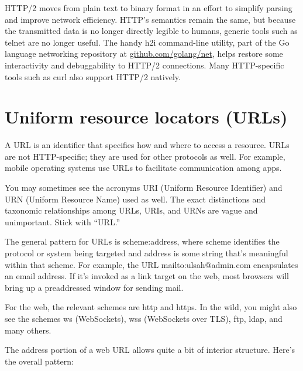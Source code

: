 HTTP/2 moves from plain text to binary format in an effort to simplify
parsing and improve network efficiency. HTTP's semantics remain the
same, but because the transmitted data is no longer directly legible to
humans, generic tools such as {telnet} are no longer useful. The handy
\protect\hypertarget{part0027_split_001.htmlux5cux23_idIndexMarker2748}{}{}\protect\hypertarget{part0027_split_001.htmlux5cux23_idIndexMarker2749}{}{}{h2i}
command-line utility, part of the Go language networking repository at
\href{http://github.com/golang/net}{github.com/golang/net}, helps
restore some interactivity and debuggability to HTTP/2 connections. Many
HTTP-specific tools such as
\protect\hypertarget{part0027_split_001.htmlux5cux23_idIndexMarker2750}{}{}{curl}
also support HTTP/2 natively.


\section{Uniform resource locators (URLs)}


\protect\hypertarget{part0027_split_002.htmlux5cux23_idIndexMarker2751}{}{}\protect\hypertarget{part0027_split_002.htmlux5cux23_idIndexMarker2752}{}{}A
URL is an identifier that specifies how and where to access a resource.
URLs are not HTTP-specific; they are used for other protocols as well.
For example, mobile operating systems use URLs to facilitate
communication among apps.

You may sometimes see the acronyms
\protect\hypertarget{part0027_split_002.htmlux5cux23_idIndexMarker2753}{}{}URI
(Uniform Resource Identifier) and
\protect\hypertarget{part0027_split_002.htmlux5cux23_idIndexMarker2754}{}{}URN
(Uniform Resource Name) used as well. The exact distinctions and
taxonomic relationships among URLs, URIs, and URNs are vague and
unimportant. Stick with ``URL.''

The general pattern for URLs is {scheme:address}, where {scheme}
identifies the protocol or system being targeted and {address} is some
string that's meaningful within that scheme. For example, the URL
mailto:ulsah@admin.com encapsulates an email address. If it's invoked as
a link target on the web, most browsers will bring up a preaddressed
window for sending mail.

For the web, the relevant schemes are http and https. In the wild, you
might also see the schemes ws (WebSockets), wss (WebSockets over TLS),
ftp, ldap, and many others.

The address portion of a web URL allows quite a bit of interior
structure. Here's the overall pattern:

